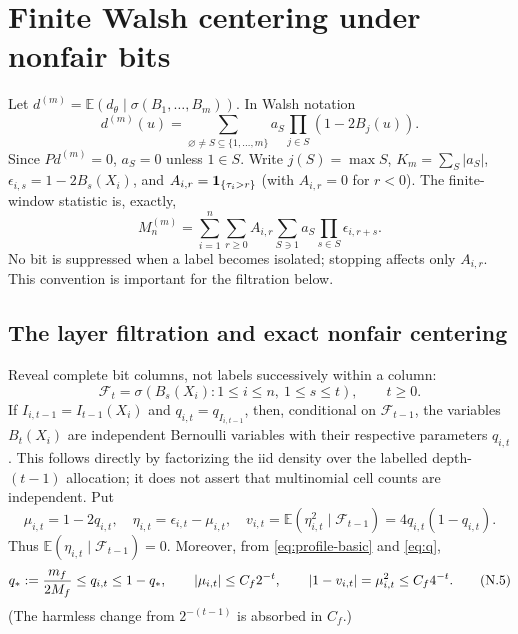 \documentclass[11pt]{article}
\numberwithin{equation}{section}
\newcommand{\E}{\mathbb E}\newcommand{\Pp}{\mathbb P}
\newcommand{\1}{\mathbf 1}\newcommand{\F}{\mathcal F}\newcommand{\D}{\mathcal D}
\begin{document}
\section{Finite Walsh centering under nonfair bits}
Let $d^{(m)}=\E(d_\theta\mid\sigma(B_1,\ldots,B_m))$.  In Walsh notation
\begin{equation}\label{eq:walsh}
d^{(m)}(u)=\sum_{\varnothing\ne S\subseteq\{1,\ldots,m\}}a_S
 \prod_{j\in S}(1-2B_j(u)).                                      \tag{N.1}
\end{equation}
Since $Pd^{(m)}=0$, $a_S=0$ unless $1\in S$.  Write $j(S)=\max S$,
$K_m=\sum_S|a_S|$, $\epsilon_{i,s}=1-2B_s(X_i)$, and
$A_{i,r}={\bf1}_{\{\tau_i>r\}}$ (with $A_{i,r}=0$ for $r<0$).  The
finite-window statistic is, exactly,
\begin{equation}\label{eq:nu-Mm}
 M_n^{(m)}=\sum_{i=1}^n\sum_{r\ge0}A_{i,r}
                  \sum_{S\ni1}a_S\prod_{s\in S}\epsilon_{i,r+s}.
                                                                    \tag{N.2}
\end{equation}
No bit is suppressed when a label becomes isolated; stopping affects only
$A_{i,r}$.  This convention is important for the filtration below.

\subsection{The layer filtration and exact nonfair centering}
Reveal complete bit columns, not labels successively within a column:
\begin{equation}\label{eq:nu-filtration}
 \F_t=\sigma(B_s(X_i):1\le i\le n,\ 1\le s\le t),\qquad t\ge0.
                                                                    \tag{N.3}
\end{equation}
If $I_{i,t-1}=I_{t-1}(X_i)$ and $q_{i,t}=q_{I_{i,t-1}}$, then, conditional
on $\F_{t-1}$, the variables $B_t(X_i)$ are independent Bernoulli variables
with their respective parameters $q_{i,t}$.  This follows directly by
factorizing the iid density over the labelled depth-$(t-1)$ allocation; it
does not assert that multinomial cell counts are independent.  Put
\begin{equation}\label{eq:nu-eta}
 \mu_{i,t}=1-2q_{i,t},\quad \eta_{i,t}=\epsilon_{i,t}-\mu_{i,t},
 \quad v_{i,t}=\E(\eta_{i,t}^2\mid\F_{t-1})=4q_{i,t}(1-q_{i,t}).
                                                                    \tag{N.4}
\end{equation}
Thus $\E(\eta_{i,t}\mid\F_{t-1})=0$.  Moreover, from
\eqref{eq:profile-basic} and \eqref{eq:q},
\begin{equation}\label{eq:nu-qbounds}
 q_*:={m_f\over2M_f}\le q_{i,t}\le1-q_*,\qquad
 |\mu_{i,t}|\le C_f2^{-t},\qquad |1-v_{i,t}|=\mu_{i,t}^2\le C_f4^{-t}.
                                                                    \tag{N.5}
\end{equation}
(The harmless change from $2^{-(t-1)}$ is absorbed in $C_f$.)
\end{document}
